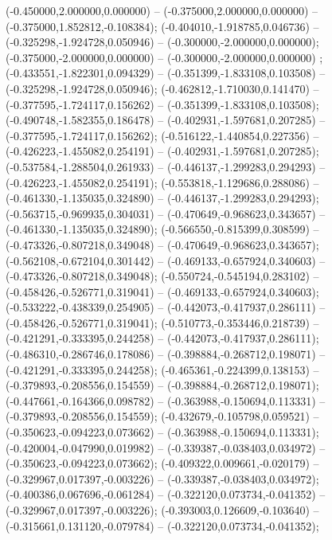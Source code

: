  (-0.450000,2.000000,0.000000) -- (-0.375000,2.000000,0.000000) -- (-0.375000,1.852812,-0.108384);
 (-0.404010,-1.918785,0.046736) -- (-0.325298,-1.924728,0.050946) -- (-0.300000,-2.000000,0.000000);
 (-0.375000,-2.000000,0.000000) -- (-0.300000,-2.000000,0.000000) ;
 (-0.433551,-1.822301,0.094329) -- (-0.351399,-1.833108,0.103508) -- (-0.325298,-1.924728,0.050946);
 (-0.462812,-1.710030,0.141470) -- (-0.377595,-1.724117,0.156262) -- (-0.351399,-1.833108,0.103508);
 (-0.490748,-1.582355,0.186478) -- (-0.402931,-1.597681,0.207285) -- (-0.377595,-1.724117,0.156262);
 (-0.516122,-1.440854,0.227356) -- (-0.426223,-1.455082,0.254191) -- (-0.402931,-1.597681,0.207285);
 (-0.537584,-1.288504,0.261933) -- (-0.446137,-1.299283,0.294293) -- (-0.426223,-1.455082,0.254191);
 (-0.553818,-1.129686,0.288086) -- (-0.461330,-1.135035,0.324890) -- (-0.446137,-1.299283,0.294293);
 (-0.563715,-0.969935,0.304031) -- (-0.470649,-0.968623,0.343657) -- (-0.461330,-1.135035,0.324890);
 (-0.566550,-0.815399,0.308599) -- (-0.473326,-0.807218,0.349048) -- (-0.470649,-0.968623,0.343657);
 (-0.562108,-0.672104,0.301442) -- (-0.469133,-0.657924,0.340603) -- (-0.473326,-0.807218,0.349048);
 (-0.550724,-0.545194,0.283102) -- (-0.458426,-0.526771,0.319041) -- (-0.469133,-0.657924,0.340603);
 (-0.533222,-0.438339,0.254905) -- (-0.442073,-0.417937,0.286111) -- (-0.458426,-0.526771,0.319041);
 (-0.510773,-0.353446,0.218739) -- (-0.421291,-0.333395,0.244258) -- (-0.442073,-0.417937,0.286111);
 (-0.486310,-0.286746,0.178086) -- (-0.398884,-0.268712,0.198071) -- (-0.421291,-0.333395,0.244258);
 (-0.465361,-0.224399,0.138153) -- (-0.379893,-0.208556,0.154559) -- (-0.398884,-0.268712,0.198071);
 (-0.447661,-0.164366,0.098782) -- (-0.363988,-0.150694,0.113331) -- (-0.379893,-0.208556,0.154559);
 (-0.432679,-0.105798,0.059521) -- (-0.350623,-0.094223,0.073662) -- (-0.363988,-0.150694,0.113331);
 (-0.420004,-0.047990,0.019982) -- (-0.339387,-0.038403,0.034972) -- (-0.350623,-0.094223,0.073662);
 (-0.409322,0.009661,-0.020179) -- (-0.329967,0.017397,-0.003226) -- (-0.339387,-0.038403,0.034972);
 (-0.400386,0.067696,-0.061284) -- (-0.322120,0.073734,-0.041352) -- (-0.329967,0.017397,-0.003226);
 (-0.393003,0.126609,-0.103640) -- (-0.315661,0.131120,-0.079784) -- (-0.322120,0.073734,-0.041352);
